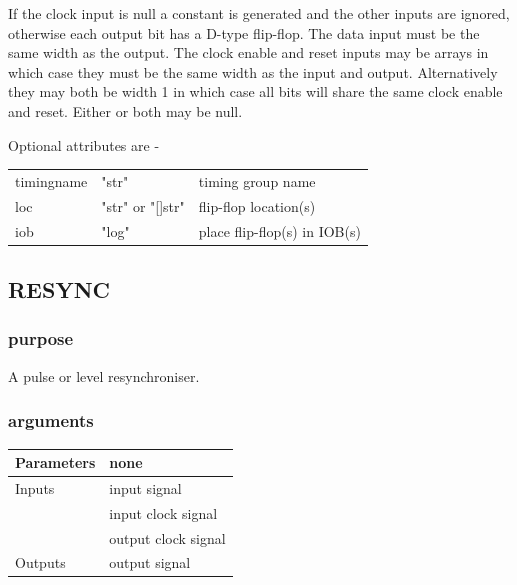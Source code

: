 \documentclass[10pt,a4paper,twoside,fleqn]{book}
\begin{document}
                    If the clock input is null a constant is generated and the
                    other inputs are ignored, otherwise each output bit has a
                    D-type flip-flop. The data input must be the same width as
                    the output. The clock enable and reset inputs may be arrays
                    in which case they must be the same width as the input and
                    output. Alternatively they may both be width 1 in which case
                    all bits will share the same clock enable and reset. Either
                    or both may be null.
                
                    Optional attributes are -
                    \begin{tabular}{| l | l | l |}
                    \hline
                    timingname  & "str"            & timing group name \\
                    loc         & "str" or "[]str" & flip-flop location(s) \\
                    iob         & "log"            & place flip-flop(s) in IOB(s) \\
                    \hline
                    \end{tabular}


            \subsection{RESYNC}

                \subsubsection{purpose}

                    A pulse or level resynchroniser.

                \subsubsection{arguments}

                    \begin{tabular}{| l | l |}
                    \hline
                    Parameters  & none \\
                    \hline
                    Inputs      & input signal \\
                                & input clock signal \\
                                & output clock signal \\
                    \hline
                    Outputs     & output signal \\
                    \hline
                    \end{tabular}
\end{document}
